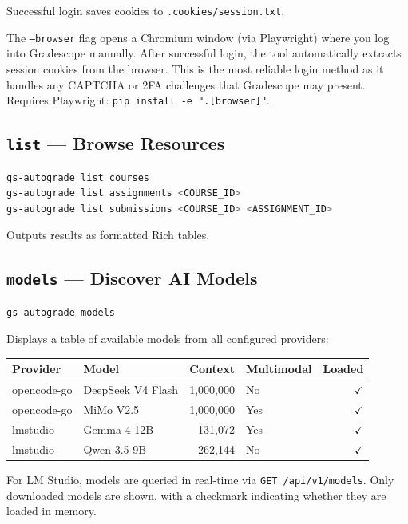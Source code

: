 \documentclass[11pt,a4paper]{article}
\begin{document}
Successful login saves cookies to \texttt{.cookies/session.txt}.

The \texttt{--browser} flag opens a Chromium window (via Playwright) where you log into Gradescope manually. After successful login, the tool automatically extracts session cookies from the browser. This is the most reliable login method as it handles any CAPTCHA or 2FA challenges that Gradescope may present. Requires Playwright: \texttt{pip install -e ".[browser]"}.

\subsection{\texttt{list} — Browse Resources}

\begin{lstlisting}[language=bash]
gs-autograde list courses
gs-autograde list assignments <COURSE_ID>
gs-autograde list submissions <COURSE_ID> <ASSIGNMENT_ID>
\end{lstlisting}

Outputs results as formatted Rich tables.

\subsection{\texttt{models} — Discover AI Models}

\begin{lstlisting}[language=bash]
gs-autograde models
\end{lstlisting}

Displays a table of available models from all configured providers:

\begin{center}
\begin{tabular}{llrlr}
\toprule
\textbf{Provider} & \textbf{Model} & \textbf{Context} & \textbf{Multimodal} & \textbf{Loaded} \\
\midrule
opencode-go & DeepSeek V4 Flash & 1,000,000 & No & $\checkmark$ \\
opencode-go & MiMo V2.5 & 1,000,000 & Yes & $\checkmark$ \\
lmstudio & Gemma 4 12B & 131,072 & Yes & $\checkmark$ \\
lmstudio & Qwen 3.5 9B & 262,144 & No & $\checkmark$ \\
\bottomrule
\end{tabular}
\end{center}

For LM Studio, models are queried in real-time via \texttt{GET /api/v1/models}. Only downloaded models are shown, with a checkmark indicating whether they are loaded in memory.
\end{document}
